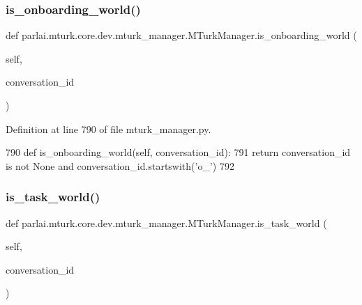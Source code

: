 \subsubsection{\texorpdfstring{is\+\_\+onboarding\+\_\+world()}{is\_onboarding\_world()}}
{\footnotesize\ttfamily def parlai.\+mturk.\+core.\+dev.\+mturk\+\_\+manager.\+M\+Turk\+Manager.\+is\+\_\+onboarding\+\_\+world (\begin{DoxyParamCaption}\item[{}]{self,  }\item[{}]{conversation\+\_\+id }\end{DoxyParamCaption})}



Definition at line 790 of file mturk\+\_\+manager.\+py.


\begin{DoxyCode}
790     \textcolor{keyword}{def }is\_onboarding\_world(self, conversation\_id):
791         \textcolor{keywordflow}{return} conversation\_id \textcolor{keywordflow}{is} \textcolor{keywordflow}{not} \textcolor{keywordtype}{None} \textcolor{keywordflow}{and} conversation\_id.startswith(\textcolor{stringliteral}{'o\_'})
792 
\end{DoxyCode}
\mbox{\label{classparlai_1_1mturk_1_1core_1_1dev_1_1mturk__manager_1_1MTurkManager_a0ed77b07d946fc884eb12ea8687c9250}} 
\subsubsection{\texorpdfstring{is\+\_\+task\+\_\+world()}{is\_task\_world()}}
{\footnotesize\ttfamily def parlai.\+mturk.\+core.\+dev.\+mturk\+\_\+manager.\+M\+Turk\+Manager.\+is\+\_\+task\+\_\+world (\begin{DoxyParamCaption}\item[{}]{self,  }\item[{}]{conversation\+\_\+id }\end{DoxyParamCaption})}



